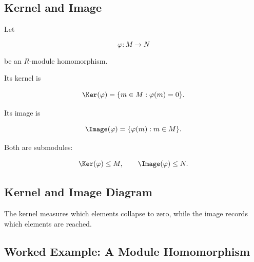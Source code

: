 \subsection{Kernel and Image}
\label{subsec:module-kernel-image}

Let

\[ \varphi:M\to N \]

be an \(R\)-module homomorphism.

Its kernel is

\[ \Ker(\varphi)=\{m\in M:\varphi(m)=0\}. \]

Its image is

\[ \Image(\varphi)=\{\varphi(m):m\in M\}. \]

Both are submodules:

\[ \Ker(\varphi)\leq M,\qquad\Image(\varphi)\leq N. \]

\subsection{Kernel and Image Diagram}
\label{subsec:module-kernel-image-visual}

\begin{center}
\end{center}

The kernel measures which elements collapse to zero, while the image records
which elements are reached.

\subsection{Worked Example: A Module Homomorphism}
\label{subsec:worked-module-homomorphism}

